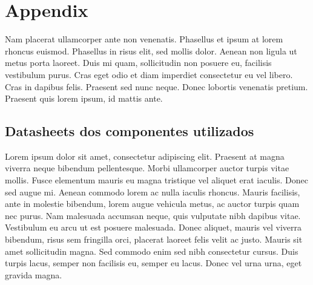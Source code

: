\chapter{Appendix} \label{chap:appendix}

Nam placerat ullamcorper ante non venenatis. Phasellus et ipsum at lorem rhoncus euismod. Phasellus in risus elit, sed mollis dolor. Aenean non ligula ut metus porta laoreet. Duis mi quam, sollicitudin non posuere eu, facilisis vestibulum purus. Cras eget odio et diam imperdiet consectetur eu vel libero. Cras in dapibus felis. Praesent sed nunc neque. Donec lobortis venenatis pretium. Praesent quis lorem ipsum, id mattis ante. 

\section{Datasheets dos componentes utilizados}

Lorem ipsum dolor sit amet, consectetur adipiscing elit. Praesent at magna viverra neque bibendum pellentesque. Morbi ullamcorper auctor turpis vitae mollis. Fusce elementum mauris eu magna tristique vel aliquet erat iaculis. Donec sed augue mi. Aenean commodo lorem ac nulla iaculis rhoncus. Mauris facilisis, ante in molestie bibendum, lorem augue vehicula metus, ac auctor turpis quam nec purus. Nam malesuada accumsan neque, quis vulputate nibh dapibus vitae. Vestibulum eu arcu ut est posuere malesuada. Donec aliquet, mauris vel viverra bibendum, risus sem fringilla orci, placerat laoreet felis velit ac justo. Mauris sit amet sollicitudin magna. Sed commodo enim sed nibh consectetur cursus. Duis turpis lacus, semper non facilisis eu, semper eu lacus. Donec vel urna urna, eget gravida magna.